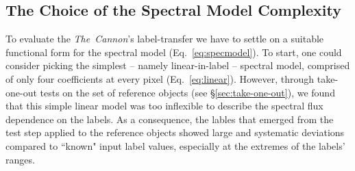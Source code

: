 \documentclass[12pt, preprint]{aastex}
\newcommand{\teff}{\mbox{$\rm T_{eff}$}}
\newcommand{\feh}{\mbox{$\rm [Fe/H]$}}
\newcommand{\logg}{\mbox{$\rm \log g$}}
\newcommand{\tc}{\textsl{The~Cannon}}
\newcommand{\apogee}{\textsl{APOGEE}}
\newcommand{\aspcap}{\textsl{ASPCAP}}
\begin{document}

\subsection{The Choice of the Spectral Model Complexity}
\label{sec:ModelComplexity} 

To evaluate the \tc 's label-transfer we have to settle on a suitable functional form for the spectral model (Eq.~\ref{eq:specmodel}).
To start, one could consider picking the simplest -- namely linear-in-label -- spectral model, comprised of only four coefficients at every pixel (Eq.~\ref{eq:linear}).
However, through take-one-out tests on the set of reference objects (see \S \ref{sec:take-one-out}), we found that this simple linear model was too inflexible to describe the spectral flux dependence on the labels.
As a consequence, the lables that emerged from the test step applied to the reference objects showed large and systematic deviations compared to ``known" input label values,
especially at the extremes of the labels' ranges. 
\end{document}
